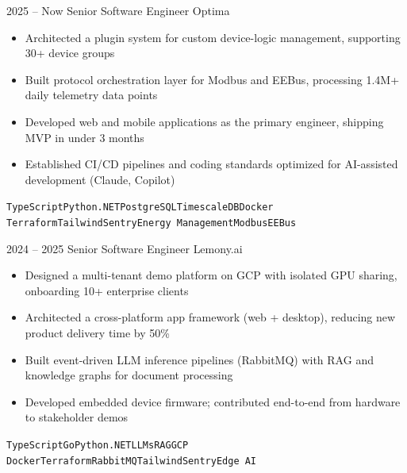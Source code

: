 \documentclass[2pt]{template}
\begin{document}

\begin{entrylist}
    \entry
    {2025 -- Now}
    {Senior Software Engineer}
    {Optima}
    {
        \begin{itemize}[noitemsep,topsep=5pt,leftmargin=8pt]
            \item Architected a plugin system for custom device-logic management, supporting 30+ device groups
            \item Built protocol orchestration layer for Modbus and EEBus, processing 1.4M+ daily telemetry data points
            \item Developed web and mobile applications as the primary engineer, shipping MVP in under 3 months
            \item Established CI/CD pipelines and coding standards optimized for AI-assisted development (Claude, Copilot)
        \end{itemize}
        \texttt{TypeScript}\slashsep\texttt{Python}\slashsep\texttt{.NET}\slashsep\texttt{PostgreSQL}\slashsep\texttt{TimescaleDB}\slashsep\texttt{Docker}\\
        {\color{gray}\texttt{Terraform}\slashsep\texttt{Tailwind}\slashsep\texttt{Sentry}\slashsep\texttt{Energy Management}\slashsep\texttt{Modbus}\slashsep\texttt{EEBus}}}
    \entry
    {2024 -- 2025}
    {Senior Software Engineer}
    {Lemony.ai}
    {
        \begin{itemize}[noitemsep,topsep=5pt,leftmargin=8pt]
            \item Designed a multi-tenant demo platform on GCP with isolated GPU sharing, onboarding 10+ enterprise clients
            \item Architected a cross-platform app framework (web + desktop), reducing new product delivery time by 50\%
            \item Built event-driven LLM inference pipelines (RabbitMQ) with RAG and knowledge graphs for document processing
            \item Developed embedded device firmware; contributed end-to-end from hardware to stakeholder demos
        \end{itemize}
        \texttt{TypeScript}\slashsep\texttt{Go}\slashsep\texttt{Python}\slashsep\texttt{.NET}\slashsep\texttt{LLMs}\slashsep\texttt{RAG}\slashsep\texttt{GCP}\\
        {\color{gray}\texttt{Docker}\slashsep\texttt{Terraform}\slashsep\texttt{RabbitMQ}\slashsep\texttt{Tailwind}\slashsep\texttt{Sentry}\slashsep\texttt{Edge AI}}}


\end{entrylist}
\end{document}
